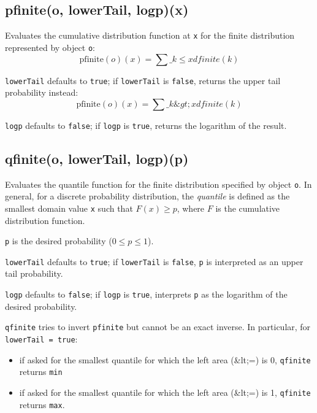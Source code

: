 \documentclass{article}
\begin{document}
    \subsection*{pfinite(o, lowerTail, logp)(x)}
    Evaluates the cumulative distribution function at \texttt{x}
for the finite distribution represented by object \texttt{o}:
$$\textrm{pfinite}(o)(x) = \sum\_{k \leq x} dfinite(k)$$


\texttt{lowerTail} defaults to \texttt{true}; if \texttt{lowerTail} is \texttt{false}, returns
the upper tail probability instead:
$$\textrm{pfinite}(o)(x) = \sum\_{k \&gt; x} dfinite(k)$$


\texttt{logp} defaults to \texttt{false}; if \texttt{logp} is \texttt{true}, returns the logarithm
of the result.


    \subsection*{qfinite(o, lowerTail, logp)(p)}
    Evaluates the quantile function for the finite distribution
specified by object \texttt{o}.
In general, for a discrete probability
distribution, the \emph{quantile} is defined as the smallest domain value
\texttt{x} such that $F(x) \geq p$, where $F$ is the cumulative
distribution function.


\texttt{p} is the desired probability ($0 \leq p \leq 1$).


\texttt{lowerTail} defaults to \texttt{true}; if \texttt{lowerTail} is \texttt{false}, \texttt{p} is
interpreted as an upper tail probability.


\texttt{logp} defaults to \texttt{false}; if \texttt{logp} is \texttt{true}, interprets \texttt{p} as
the logarithm of the desired probability.


\texttt{qfinite} tries to invert \texttt{pfinite} but cannot be an exact inverse.
In particular, for \texttt{lowerTail = true}:


\begin{itemize}

\item if asked for the smallest quantile for which the left area (\&lt;=) is 0, \texttt{qfinite} returns
\texttt{min}

\item if asked for the smallest quantile for which the left area (\&lt;=) is 1,
\texttt{qfinite} returns \texttt{max}.

\end{itemize}
\end{document}
